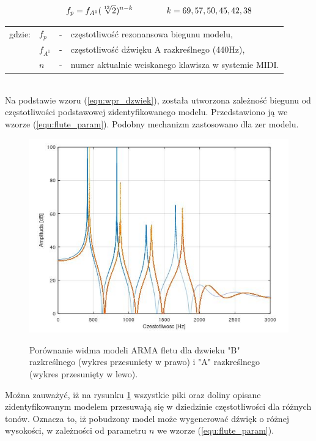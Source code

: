 \begin{equation} \label{equ:flute_param}
\openup\jot
\begin{aligned}[t]
f_{p} = f_{A^{1}}(\sqrt[12]{2})^{n-k} \\ 
\end{aligned}
\qquad\qquad %
\begin{aligned}[t]
k = 69, 57, 50, 45, 42, 38 \\
\end{aligned}
\end{equation}
\begin{tabular}{ l l l l}
	gdzie: & $f_{p}$ &  - & częstotliwość rezonansowa biegunu modelu, \\
	&	$f_{A^{1}}$ & - &  częstotliwość dźwięku A razkreślnego (440Hz), \\
	&	$n$ & - &  numer aktualnie wciskanego klawisza w systemie MIDI.\\
\end{tabular} \\

Na podstawie wzoru (\ref{equ:wpr_dzwiek}), została utworzona zależność biegunu od częstotliwości podstawowej zidentyfikowanego modelu. Przedstawiono ją we wzorze (\ref{equ:flute_param}). Podobny mechanizm zastosowano dla zer modelu. 

\begin{figure}[H]
	\centering
	\includegraphics[width=11.5cm]{grafiki/Model_B_A}
	\label{rys:por_mod_flet}
	\captionsetup{justification=centering}
	\caption{Porównanie widma modeli ARMA fletu dla dzwieku "B" razkreślnego (wykres przesuniety w prawo) i "A" razkreślnego (wykres przesunięty w lewo).}
	\label{rys:por_mod_flet}
\end{figure}
Można zauważyć, iż na rysunku \ref{rys:por_mod_flet} wszystkie piki oraz doliny opisane zidentyfikowanym modelem przesuwają się w dziedzinie częstotliwości dla różnych tonów. Oznacza to, iż pobudzony model może wygenerować dźwięk o różnej wysokości, w zależności od parametru $n$ we wzorze (\ref{equ:flute_param}).


